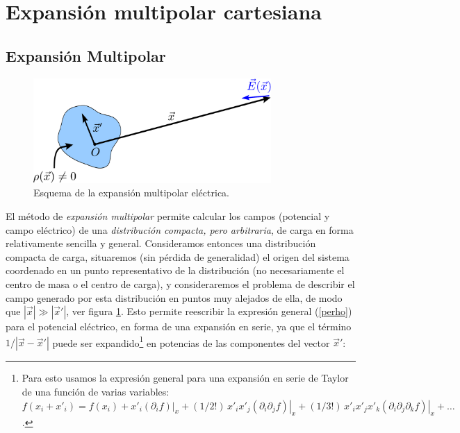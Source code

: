 \section{Expansión multipolar cartesiana}
\subsection{Expansión Multipolar}
\begin{figure}[!h]
\centerline{\includegraphics[height=4cm]{fig/fig-expansion-multipolar-electrica-01.pdf}}
\caption{Esquema de la expansión multipolar eléctrica.}
\label{fig:emc}
\end{figure}
El método de {\em expansión multipolar} permite calcular los campos (potencial y campo eléctrico) de una
\textit{distribución compacta, pero arbitraria}, de carga en forma relativamente sencilla y general. Consideramos entonces una distribución compacta de carga, situaremos (sin pérdida de generalidad) el origen del sistema coordenado en un punto representativo de la distribución (no necesariamente el centro de masa o el centro de carga), y consideraremos el problema de describir el
campo generado por esta distribución en puntos muy alejados de ella, de modo
que $|\vec{x}|\gg|\vec{x}'|$, ver figura \ref{fig:emc}. Esto permite
reescribir la expresión general (\ref{perho}) para el potencial
eléctrico, en forma de una expansión en serie, ya
que el término $1/\left|\vec{x}-\vec{x}'\right|$ puede ser expandido\footnote{Para esto usamos la expresión general para una expansión en serie de Taylor de una función de varias variables: $f(x_i+x'_i)=f(x_i)+x'_i\left.(\partial_if)\right|_x+(1/2!)\,x'_ix'_j\left.(\partial_i\partial_jf)\right|_x +(1/3!)\,x'_ix'_jx'_k\left.(\partial_i\partial_j\partial_kf)\right|_x+\dots$.}
en potencias de las componentes del vector $\vec{x}'$:
